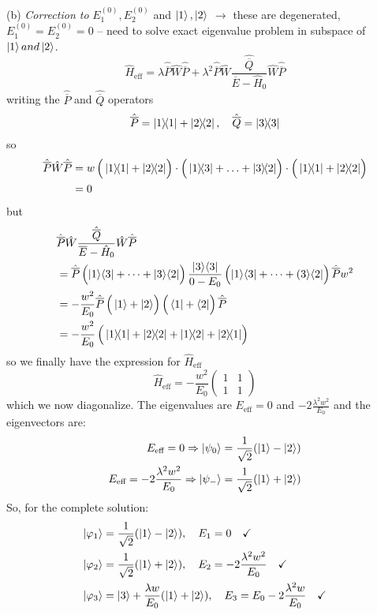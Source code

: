 \documentclass[12pt]{article}
\begin{document}
(b) \emph{Correction to} $E_1^{(0)}, E_2^{(0)}$ and $\ket{1}, \ket{2}$ 
$\rightarrow$ these are degenerated, $E_1^{(0)} = E_2^{(0)} = 0$
-- need to solve exact eigenvalue
problem in subspace of $\ket{1} and \ket{2}$.
\[
\hat{H}_{\text{eff}} = \lambda \hat{\overline{P}} \hat{W} \hat{\overline{P}} +
\lambda^{2}  \hat{\overline{P}} \hat{W} \frac{\hat{\overline{Q}}}{\overline{E} - \hat{H}_0} \hat{W} \hat{\overline{P}}
\]
writing the $\hat{\overline{P}}$ and $\hat{\overline{Q}}$ operators
\[
\hat{\overline{P}} = \op{1} + \op{2},\quad \hat{\overline{Q}} = \op{3}
\]
so
\[
\begin{aligned}
\hat{\overline{P}} \hat{W} \hat{\overline{P}} 
&= w\left(\Vstrut\op{1}+\op{2}\right)\cdot \left(\Vstrut\op{1}{3}+\ldots+\op{3}{2}\right) \cdot\left(\Vstrut\op{1}+\op{2}\right)\\
&= 0
\end{aligned}
\]
but
\[
\begin{aligned}
&\hat{\overline{P}} \hat{W} \frac{\hat{\overline{Q}}}{\overline{E} - \hat{H}_0} \hat{W} \hat{\overline{P}}\\
&=\hat{\overline{P}}\left(\Vstrut|1\rangle\langle 3|+\cdots+| 3\rangle\langle 2|\right) \frac{|3\rangle\langle 3|}{0-E_{0}}
\left(\Vstrut|1\rangle\langle 3|+\cdots+(3\rangle\langle 2|\right) \hat{\overline{P}}  w^{2}\\
&=-\frac{w^2}{E_0}\hat{\overline{P}} \left(\Vstrut\ket{1}+\ket{2}\right)\left(\Vstrut\bra{1}+\bra{2}\right) \hat{\overline{P}}\\
&=-\frac{w^2}{E_0}\left(\Vstrut\op{1}+\op{2}+\op{1}{2}+\op{2}{1}\right)
\end{aligned}
\]
so we finally have the expression for $\hat{H}_{\text{eff}}$
\[
\hat{H}_{\text{eff}} = -\frac{w^2}{E_0} \begin{pmatrix}1&1\\1&1\end{pmatrix}
\]
which we now diagonalize. 
The eigenvalues are $E_{\text{eff}} = 0$ and $ -2\frac{\lambda^2w^2}{E_0}$
and the eigenvectors are:
\[
\begin{aligned}
E_{\text{eff}} = 0
\Rightarrow \ket{\psi_0} = \frac{1}{\sqrt{2}}(\ket{1}-\ket{2})\\
E_{\text{eff}} = -2\frac{\lambda^2w^2}{E_0}
\Rightarrow \ket{\psi_-} = \frac{1}{\sqrt{2}}(\ket{1}+\ket{2})
\end{aligned}
\]
So, for the complete solution:
\[
\begin{aligned}
\ket{\varphi_1} &= \frac{1}{\sqrt{2}}(\ket{1}-\ket{2}),               \quad E_1 = 0 \quad\checkmark\\
\ket{\varphi_2} &= \frac{1}{\sqrt{2}}(\ket{1}+\ket{2}),               \quad E_2 = -2\frac{\lambda^2w^2}{E_0} \quad\checkmark\\
\ket{\varphi_3} &=\ket{3} + \frac{\lambda w}{E_{0}}(\ket{1}+\ket{2}), \quad E_3 = E_{0}-2 \frac{\lambda^{2} w}{E_{0}} \quad\checkmark
\end{aligned}
\]
\end{document}
